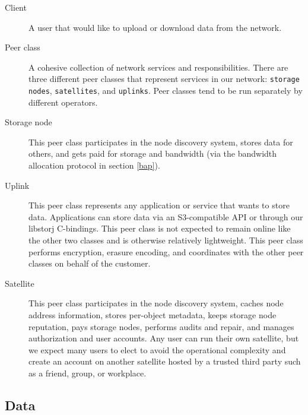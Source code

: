 \documentclass[11pt,fleqn,openany]{book}
\newcommand{\x}[1]{{\tt #1}} \newcommand{\code}[1]{{\em #1}}
\begin{document}
\begin{description}
\item[Client] A user that would like to upload or download data from the network.

\item[Peer class] A cohesive collection of network services and
  responsibilities. There are three different peer classes that represent
  services in our network: \x{storage nodes}, \x{satellites}, and \x{uplinks}.
  Peer classes   tend to be run separately by different operators.

\item[Storage node] This peer class participates in the node discovery
  system, stores data for others, and gets paid for storage and bandwidth
  (via the bandwidth allocation protocol in section \ref{bap}).

\item[Uplink] This peer class represents any application or
  service that wants to store data. Applications can store data via an
  S3-compatible API or through our libstorj C-bindings. This peer class
  is not expected to remain online like the other two classes and is otherwise
  relatively lightweight. This peer class performs encryption, erasure encoding,
  and coordinates with the other peer classes on behalf of the customer.

\item[Satellite] This peer class participates in the node discovery system,
  caches node address information, stores per-object metadata, keeps storage
  node reputation, pays storage nodes, performs audits and repair, and manages
  authorization and user accounts.
  Any user can run their own satellite, but we expect many users
  to elect to avoid the operational complexity and create an account on
  another satellite hosted by a trusted third party such as a friend, group, or
  workplace.
\end{description}

\subsection{Data}
\end{document}

